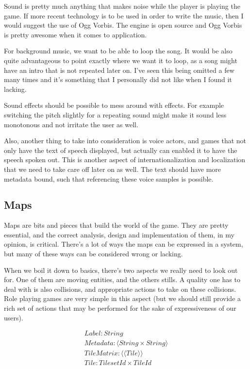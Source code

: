 Sound is pretty much anything that makes noise while the player is playing the
game. If more recent technology is to be used in order to write the music, then
I would suggest the use of Ogg Vorbis. The engine is open source and Ogg Vorbis
is pretty awesome when it comes to application.

For background music, we want to be able to loop the song. It would be also
quite advantageous to point exactly where we want it to loop, as a song might
have an intro that is not repeated later on. I've seen this being omitted a few
many times and it's something that I personally did not like when I found it
lacking.

Sound effects should be possible to mess around with effects. For example
switching the pitch slightly for a repeating sound might make it sound less
monotonous and not irritate the user as well.

Also, another thing to take into consideration is voice actors, and games that
not only have the text of speech displayed, but actually can enabled it to have
the speech spoken out. This is another aspect of internationalization and
localization that we need to take care off later on as well. The text should
have more metadata bound, such that referencing these voice samples is possible.

\subsection{Maps}

Maps are bits and pieces that build the world of the game. They are pretty
essential, and the correct analysis, design and implementation of them, in my
opinion, is critical. There's a lot of ways the maps can be expressed in a
system, but many of these ways can be considered wrong or lacking.

When we boil it down to basics, there's two aspects we really need to look out
for. One of them are moving entities, and the others stills. A quality one has
to deal with is also collisions, and appropriate actions to take on these
collisions. Role playing games are very simple in this aspect (but we should
still provide a rich set of actions that may be performed for the sake of
expressiveness of our users).

\begin{equation}
\begin{split}
Label\colon String \\
Metadata\colon \langle String \times String \rangle \\
TileMatrix\colon \langle \langle Tile \rangle \rangle \\
Tile\colon TilesetId \times TileId
\end{split}
\end{equation}

